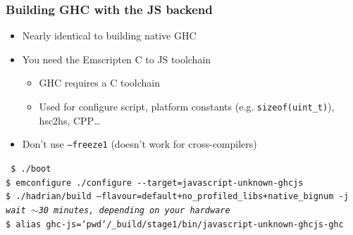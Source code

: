 \documentclass[aspectratio=169]{beamer}
\begin{document}
\begin{frame}[fragile]
\frametitle{Building GHC with the JS backend}
\begin{itemize}
\item Nearly identical to building native GHC
\item You need the Emscripten C to JS toolchain
\begin{itemize}
\item GHC requires a C toolchain
\item Used for configure script, platform constants (e.g.
  \texttt{sizeof(uint\_t)}), hsc2hs, CPP…
\end{itemize}
  \item \alert{Don't use \texttt{--freeze1} (doesn't work for cross-compilers)}
\end{itemize}

\vspace{1cm}

\texttt
{\footnotesize
\$ ./boot \\
\$ \alert{emconfigure} ./configure -{}-target=\alert{javascript-unknown-ghcjs} \\
\$ ./hadrian/build --flavour=default+no\_profiled\_libs+\alert{native\_bignum} -j \\
\vspace{0.5cm}
\textit{wait $\sim$30 minutes, depending on your hardware} \\
\vspace{0.5cm}
\$ alias ghc-js=`pwd`/\_build/stage1/bin/javascript-unknown-ghcjs-ghc\\
}
\end{frame}
\end{document}
